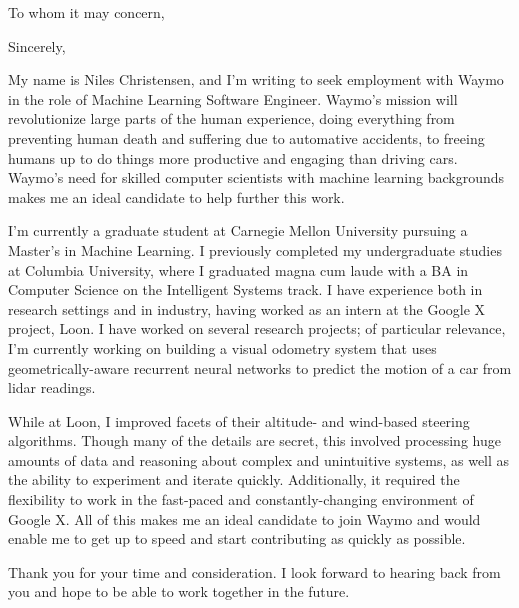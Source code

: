\documentclass[11pt,a4paper,sans]{moderncv}        %
\begin{document}
\date{October 21, 2020}
\opening{To whom it may concern,}
\closing{Sincerely,}
\makelettertitle
My name is Niles Christensen, and I’m writing to seek employment with Waymo in the role of Machine Learning Software Engineer. Waymo’s mission will revolutionize large parts of the
human experience, doing everything from preventing human death and suffering due to automative accidents, to freeing humans up to do things more productive and engaging than driving cars.
Waymo’s need for skilled computer scientists with machine learning backgrounds makes me an ideal candidate to help further this work.

I’m currently a graduate student at Carnegie Mellon University pursuing a Master's in Machine Learning. I previously completed my undergraduate studies at Columbia University,
where I graduated magna cum laude with a BA in Computer Science on the Intelligent Systems track. I have experience both in research settings and in industry, having worked
as an intern at the Google X project, Loon. I have worked on several research projects; of particular relevance, I'm currently working
on building a visual odometry system that uses geometrically-aware recurrent neural networks to predict the motion of a car from lidar readings.

While at Loon, I improved facets of their altitude- and wind-based steering algorithms. Though many of the details are secret, this involved processing huge amounts of data and reasoning about complex and unintuitive systems,
as well as the ability to experiment and iterate quickly. Additionally, it required the flexibility to work in the fast-paced and constantly-changing environment of Google X.
All of this makes me an ideal candidate to join Waymo and would enable me to get up to speed and start contributing as quickly as possible.

Thank you for your time and consideration. I look forward to hearing back from you and hope to be able to work together in the future.

\makeletterclosing
\end{document}
